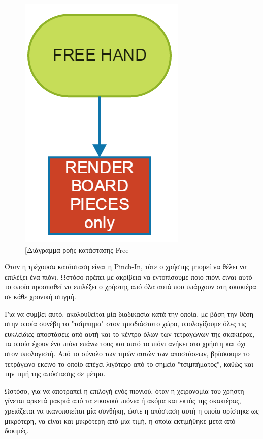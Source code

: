 \begin{figure}[H]
    \centering
    \includegraphics[scale=0.35, angle=0]{Files/Figures/free_hand.png}
    \caption[Διάγραμμα ροής κατάστασης Free]{[Διάγραμμα ροής κατάστασης Free}
    \label{fig:free}
\end{figure}



Όταν η τρέχουσα κατάσταση είναι η Pinch-In, τότε ο χρήστης μπορεί να θέλει να επιλέξει ένα πιόνι. Ωστόσο πρέπει με ακρίβεια να εντοπίσουμε ποιο πιόνι είναι αυτό το οποίο προσπαθεί να επιλέξει ο χρήστης από όλα αυτά που υπάρχουν στη σκακιέρα σε κάθε χρονική στιγμή. 

Για να συμβεί αυτό, ακολουθείται μία διαδικασία κατά την οποία, με βάση την θέση στην οποία συνέβη το "τσίμπημα" στον τρισδιάστατο χώρο, υπολογίζουμε όλες τις ευκλείδιες αποστάσεις από αυτή και το κέντρο όλων των τετραγώνων της σκακιέρας, τα οποία έχουν ένα πιόνι επάνω τους και αυτό το πιόνι ανήκει στο χρήστη και όχι στον υπολογιστή. Από το σύνολο των τιμών αυτών των αποστάσεων, βρίσκουμε το τετράγωνο εκείνο το οποίο απέχει λιγότερο από το σημείο "τσιμπήματος", καθώς και την τιμή της απόστασης σε μέτρα. 


Ωστόσο, για να αποτραπεί η επιλογή ενός πιονιού, όταν η χειρονομία του χρήστη γίνεται αρκετά μακριά από τα εικονικά πιόνια ή ακόμα και εκτός της σκακιέρας, χρειάζεται να ικανοποιείται μία συνθήκη, ώστε η απόσταση αυτή η οποία ορίστηκε ως μικρότερη, να είναι και μικρότερη από μία τιμή, η οποία εκτιμήθηκε μετά από δοκιμές.


